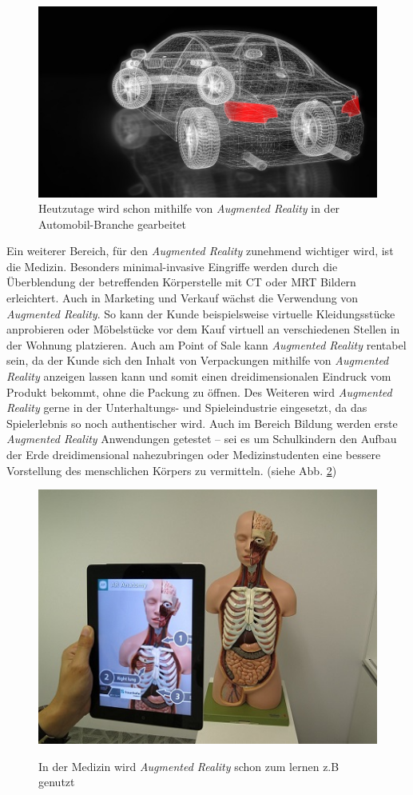 \documentclass[12pt,utf8]{scrartcl}
\begin{document}
\begin{flushleft}
\begin{figure}[H]
	\centering
	\includegraphics[width=0.8\linewidth]{images/autoholo}
	\caption{Heutzutage wird schon mithilfe von \textit{Augmented Reality} in der Automobil-Branche gearbeitet\cite{online5}}
	\label{fig:autoholo}
\end{figure}

Ein weiterer Bereich, für den \textit{Augmented Reality} zunehmend wichtiger wird, ist die Medizin.  Besonders minimal-invasive Eingriffe werden durch die Überblendung der betreffenden Körperstelle mit CT oder MRT Bildern erleichtert. Auch in Marketing und Verkauf wächst die Verwendung von \textit{Augmented Reality}. So kann der Kunde beispielsweise virtuelle Kleidungsstücke anprobieren oder Möbelstücke vor dem Kauf virtuell an verschiedenen Stellen in der Wohnung platzieren. Auch am Point of Sale kann \textit{Augmented Reality} rentabel sein, da der Kunde sich den Inhalt von Verpackungen mithilfe von \textit{Augmented Reality} anzeigen lassen kann und somit einen dreidimensionalen Eindruck vom Produkt bekommt, ohne die Packung zu öffnen. Des Weiteren wird \textit{Augmented Reality} gerne in der Unterhaltungs- und Spieleindustrie eingesetzt, da das Spielerlebnis so noch authentischer wird. Auch im Bereich Bildung werden erste \textit{Augmented Reality} Anwendungen getestet – sei es um Schulkindern den Aufbau der Erde dreidimensional nahezubringen oder Medizinstudenten eine bessere Vorstellung des menschlichen Körpers zu vermitteln. (siehe Abb. \ref{fig:med})
\linebreak

\begin{figure}[H]
	\centering
	\includegraphics[width=0.8\linewidth]{images/medizin}
	\caption{In der Medizin wird \textit{Augmented Reality} schon zum lernen z.B genutzt} \cite{online3}
	\label{fig:med}
\end{figure}



\end{flushleft}
\end{document}
